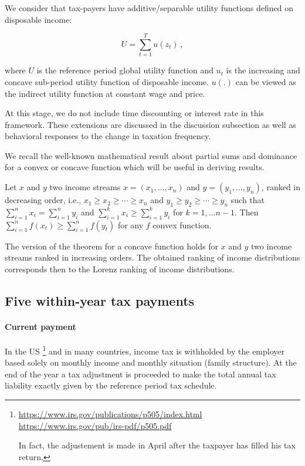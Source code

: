 We consider that tax-payers have additive/separable utility functions defined
on disposable income:%

\begin{equation}
U=\sum_{t=1}^{T}u(z_{t})\,,\label{additive_u}%
\end{equation}


where $U$ is the reference period global utility function and $u_{t}$ is the
increasing and concave sub-period utility function of disposable income.
$u(.)$ can be viewed as the indirect utility function at constant wage and price.

At this stage, we do not include time discounting or interest rate in this
framework. These extensions are discussed in the discussion subsection as well
as behavioral responses to the change in taxation frequency.\ 

We recall the well-known mathematical result about partial sums and dominance
for a convex or concave function which will be useful in deriving results.

\begin{theorem}
Let $x$ and $y$ two income streams $x=(x_{1},...,x_{n})$ and $y=(y_{1}%
,...,y_{n})$, ranked in decreasing order, i.e., $x_{1}\geq x_{2}\geq\cdots\geq
x_{n}$ and $y_{1}\geq y_{2}\geq\cdots\geq y_{n}$ such that $\sum_{i=1}%
^{n}x_{i}=\sum_{i=1}^{n}y_{i}$ and $\sum_{i=1}^{k}x_{i}\geq\sum_{i=1}^{k}%
y_{i}$ for $k=1,...n-1.$ Then $\sum_{i=1}^{n}f(x_{t})\geq\sum_{i=1}^{n}%
f(y_{t})$ for any $f$ convex function.
\end{theorem}

The version of the theorem for a concave function holds for $x$ and $y$ two
income streams ranked in increasing orders. The obtained ranking of income
distributions corresponds then to the Lorenz ranking of income distributions.

\subsection{Five within-year tax payments}

\paragraph{Current payment}

In the US
\footnote{\url{https://www.irs.gov/publications/p505/index.html}\newline%
\url{https://www.irs.gov/pub/irs-pdf/p505.pdf}
\par
In fact, the adjustement is made in April after the taxpayer has filled his
tax return.} and in many countries, income tax is withholded by the employer
based solely on monthly income and monthly situation (family structure). At
the end of the year a tax adjustment is proceeded to make the total annual tax
liability exactly given by the reference period tax schedule.%

